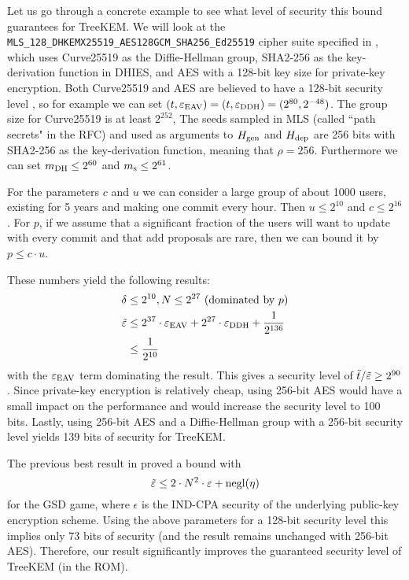 Let us go through a concrete example to see what level of security this bound guarantees for TreeKEM. We will look at the \texttt{MLS\_128\_DHKEMX25519\_AES128GCM\_SHA256\_Ed25519} cipher suite specified in \cite{rfc9420}, which uses Curve25519 as the Diffie-Hellman group, SHA2-256 as the key-derivation function in DHIES, and AES with a 128-bit key size for private-key encryption. Both Curve25519 and AES are believed to have a 128-bit security level , so for example we can set $(t, \varepsilon_\mathrm{EAV}) = (t, \varepsilon_\mathrm{DDH}) = (2^{80}, 2^{-48})$. The group size for Curve25519 is at least $2^{252}$,   The seeds sampled in MLS (called ``path secrets" in the RFC) and used as arguments to $H_\mathrm{gen}$ and $H_\mathrm{dep}$ are 256 bits with SHA2-256 as the key-derivation function, meaning that $\rho = 256$. Furthermore we can set $m_\mathrm{DH} \le 2^{60}$ and $m_\mathrm{s} \le 2^{61}$.

For the parameters $c$ and $u$ we can consider a large group of about 1000 users, existing for 5 years and making one commit every hour. Then $u \le 2^{10}$ and $c \le 2^{16}$. For $p$, if we assume that a significant fraction of the users will want to update with every commit and that add proposals are rare, then we can bound it by $p \le c \cdot u$.

These numbers yield the following results:
\begin{align*}
	\delta & \le 2^{10}, N \le 2^{27}                                                      \text{ (dominated by $p$)} \\
	\tilde{\varepsilon}    & \le 2^{37} \cdot \varepsilon_\mathrm{EAV} + 2^{27} \cdot \varepsilon_\mathrm{DDH} + \frac{1}{2^{136}}                                          \\
	       & \le \frac{1}{2^{10}}
\end{align*}
with the $\varepsilon_\mathrm{EAV}$ term dominating the result. This gives a security level of $\tilde{t}/\tilde{\varepsilon} \ge 2^{90}$. Since private-key encryption is relatively cheap, using 256-bit AES would have a small impact on the performance and would increase the security level to 100 bits. Lastly, using 256-bit AES and a Diffie-Hellman group with a 256-bit security level yields 139 bits of security for TreeKEM.

The previous best result in \cite[Theorem 3]{ttkem} proved a bound with
\[
	\tilde{\varepsilon} \le 2 \cdot N^2 \cdot \varepsilon + \mathrm{negl}(\eta)
\]
for the GSD game, where $\epsilon$ is the IND-CPA security of the underlying public-key encryption scheme. Using the above parameters for a 128-bit security level this implies only 73 bits of security (and the result remains unchanged with 256-bit AES). Therefore, our result significantly improves the guaranteed security level of TreeKEM (in the ROM).
